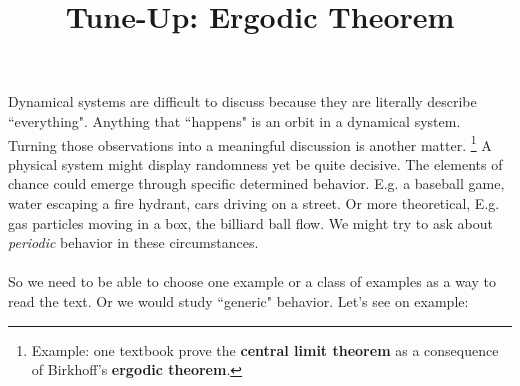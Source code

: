 \documentclass[12pt]{article}
\title{Tune-Up: Ergodic Theorem}
\date{}
\begin{document}
\sffamily

\maketitle

\noindent Dynamical systems are difficult to discuss because they are literally describe ``everything".  Anything that ``happens" is an orbit in a dynamical system.  Turning those observations into a meaningful discussion is another matter.  \footnote{Example:  one textbook prove the \textbf{central limit theorem} as a consequence of Birkhoff's \textbf{ergodic theorem}.}  A physical system might display randomness yet be quite decisive.  The elements of chance could emerge through specific determined behavior. E.g. a baseball game, water escaping a fire hydrant, cars driving on a street.  Or more theoretical, E.g. gas particles moving in a box, the billiard ball flow.  We might try to ask about \textit{periodic} behavior in these circumstances.  \\ \\
So we need to be able to choose one example or a class of examples as a way to read the text.  Or we would study ``generic" behavior.  Let's see on example:
\end{document}
